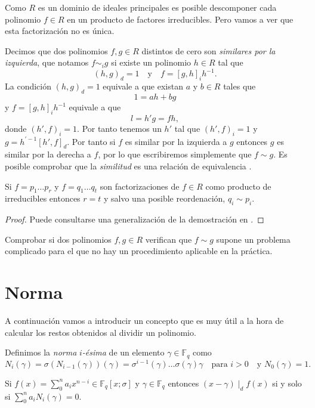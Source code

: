 Como \(R\) es un dominio de ideales principales es posible descomponer cada polinomio \(f \in R\) en un producto de factores irreducibles.
Pero vamos a ver que esta factorización no es única.

Decimos que dos polinomios \(f, g \in R\) distintos de cero son \emph{similares por la izquierda}, que notamos \(f \sim_i g\) si existe un polinomio \(h \in R\) tal que 
\[
  (h, g)_d = 1 \quad\text{y}\quad f = [g, h]_ih^{-1}.
\]
La condición \((h, g)_d = 1\) equivale a que existan \(a\) y \(b \in R\) tales que
\[
  1 = ah + bg
\]
y \(f =  [g, h]_ih^{-1}\) equivale a que 
\[
  l = h'g = fh,
\]
donde \((h', f)_i = 1\).
Por tanto tenemos un \(h'\) tal que \((h', f)_i = 1\) y \(g = h^{'-1}[h', f]_d\).
Por tanto si \(f\) es similar por la izquierda a \(g\) entonces \(g\) es similar por la derecha a \(f\), por lo que escribiremos simplemente que \(f \sim g\).
Es posible comprobar que la \emph{similitud} es una relación de equivalencia \parencite[ver][p. 11]{jacobson_finite-dimensional_1996}.

\begin{theorem}
  Si \(f = p_1 \dots p_r\) y \(f = q_1 \dots q_t\) son factorizaciones de \(f \in R\) como producto de irreducibles entonces \(r= t\) y salvo una posible reordenación, \(q_i \sim p_i\).
\end{theorem}

\begin{proof}
  Puede consultarse una generalización de la demostración en \parencite[Teorema 1.2.9]{jacobson_finite-dimensional_1996}.
\end{proof}

Comprobar si dos polinomios \(f, g \in R\) verifican que \(f \sim g\) supone un problema complicado para el que no hay un procedimiento aplicable en la práctica.

\section{Norma}

A continuación vamos a introducir un concepto que es muy útil a la hora de calcular los restos obtenidos al dividir un polinomio.

Definimos la \emph{norma} \(i\)\emph{-ésima} de un elemento \(\gamma \in \mathbb F_q\) como
\[
  N_i(\gamma) = \sigma(N_{i-1}(\gamma))(\gamma) = \sigma^{i-1}(\gamma)\dots \sigma(\gamma)\gamma \quad\text{para } i > 0 \quad\text{y } N_0(\gamma) = 1.
\]

\begin{proposition}
  \label{prop:norma-divisor}
  Si \(f(x) = \sum_0^n a_ix^{n-i} \in \mathbb F_q[x; \sigma]\) y \(\gamma \in \mathbb F_q\) entonces \((x - \gamma) \mid_d f(x)\) si y solo si \(\sum_0^n a_iN_{i}(\gamma) = 0\).
\end{proposition}

